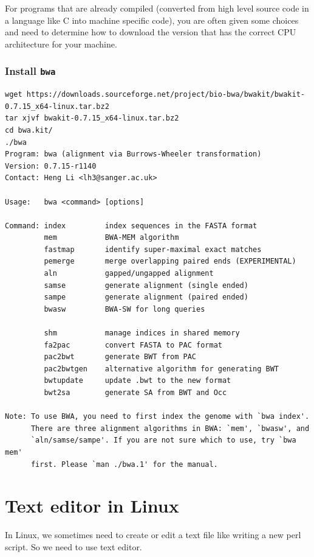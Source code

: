 \documentclass[]{book}
\begin{document}
For programs that are already compiled (converted from high level source code in a language like C into machine specific code), you are often given some choices and need to determine how to download the version that has the correct CPU architecture for your machine.

\hypertarget{install-bwa-1}{%
\subsection{\texorpdfstring{Install \texttt{bwa}}{Install bwa}}\label{install-bwa-1}}

\begin{verbatim}
wget https://downloads.sourceforge.net/project/bio-bwa/bwakit/bwakit-0.7.15_x64-linux.tar.bz2
tar xjvf bwakit-0.7.15_x64-linux.tar.bz2
cd bwa.kit/
./bwa
Program: bwa (alignment via Burrows-Wheeler transformation)
Version: 0.7.15-r1140
Contact: Heng Li <lh3@sanger.ac.uk>

Usage:   bwa <command> [options]

Command: index         index sequences in the FASTA format
         mem           BWA-MEM algorithm
         fastmap       identify super-maximal exact matches
         pemerge       merge overlapping paired ends (EXPERIMENTAL)
         aln           gapped/ungapped alignment
         samse         generate alignment (single ended)
         sampe         generate alignment (paired ended)
         bwasw         BWA-SW for long queries

         shm           manage indices in shared memory
         fa2pac        convert FASTA to PAC format
         pac2bwt       generate BWT from PAC
         pac2bwtgen    alternative algorithm for generating BWT
         bwtupdate     update .bwt to the new format
         bwt2sa        generate SA from BWT and Occ

Note: To use BWA, you need to first index the genome with `bwa index'.
      There are three alignment algorithms in BWA: `mem', `bwasw', and
      `aln/samse/sampe'. If you are not sure which to use, try `bwa mem'
      first. Please `man ./bwa.1' for the manual.
\end{verbatim}

\hypertarget{text-editor-in-linux}{%
\chapter{Text editor in Linux}\label{text-editor-in-linux}}

In Linux, we sometimes need to create or edit a text file like writing a new perl script. So we need to use text editor.
\end{document}
